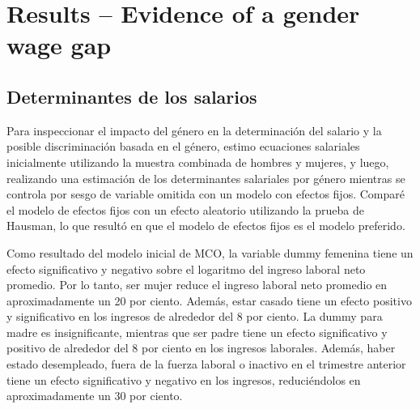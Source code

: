 \section{Results -- Evidence of a gender wage gap}
\subsection{Determinantes de los salarios}
Para inspeccionar el impacto del género en la determinación del salario y la posible discriminación basada en el género, estimo ecuaciones salariales inicialmente utilizando la muestra combinada de hombres y mujeres, y luego, realizando una estimación de los determinantes salariales por género mientras se controla por sesgo de variable omitida con un modelo con efectos fijos. Comparé el modelo de efectos fijos con un efecto aleatorio utilizando la prueba de Hausman, lo que resultó en que el modelo de efectos fijos es el modelo preferido.

Como resultado del modelo inicial de MCO, la variable dummy femenina tiene un efecto significativo y negativo sobre el logaritmo del ingreso laboral neto promedio. Por lo tanto, ser mujer reduce el ingreso laboral neto promedio en aproximadamente un 20 por ciento. Además, estar casado tiene un efecto positivo y significativo en los ingresos de alrededor del 8 por ciento. La dummy para madre es insignificante, mientras que ser padre tiene un efecto significativo y positivo de alrededor del 8 por ciento en los ingresos laborales. Además, haber estado desempleado, fuera de la fuerza laboral o inactivo en el trimestre anterior tiene un efecto significativo y negativo en los ingresos, reduciéndolos en aproximadamente un 30 por ciento.

